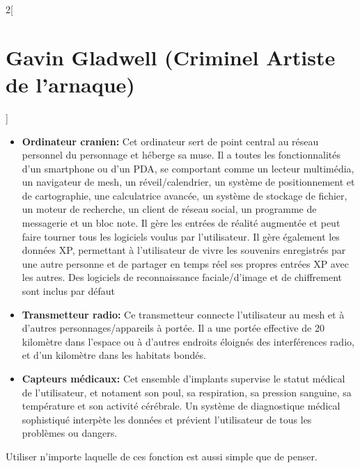 \documentclass[a4paper,9pt]{article}
\begin{document}
\begin{multicols}{2}[\section*{Gavin Gladwell (Criminel Artiste de l'arnaque)}]
\begin{itemize}
   \item \textbf{Ordinateur cranien:} Cet ordinateur sert de point central au
      réseau personnel du personnage et héberge sa muse. Il a toutes
      les fonctionnalités d'un smartphone ou d'un PDA, se comportant comme un
      lecteur multimédia, un navigateur de mesh, un réveil/calendrier, un
      système de positionnement et de cartographie, une calculatrice avancée,
      un système de stockage de fichier, un moteur de recherche, un client de
      réseau social, un programme de messagerie et un bloc note. Il gère les
      entrées de réalité augmentée et peut faire tourner tous les logiciels
      voulus par l'utilisateur. Il gère également les données XP, permettant à
      l'utilisateur de vivre les souvenirs enregistrés par une autre personne et
      de partager en temps réel ses propres entrées XP avec les autres. Des
      logiciels de reconnaissance faciale/d'image et de chiffrement
      sont inclus par défaut
   \item \textbf{Transmetteur radio:} Ce transmetteur connecte l'utilisateur au
      mesh et à d'autres personnages/appareils à portée. Il a une portée
      effective de 20 kilomètre dans l'espace ou à d'autres endroits éloignés
      des interférences radio, et d'un kilomètre dans les habitats bondés.
   \item \textbf{Capteurs médicaux:} Cet ensemble d'implants supervise le
      statut médical de l'utilisateur, et notament son poul, sa respiration, sa
      pression sanguine, sa température et son activité cérébrale. Un système de
      diagnostique médical sophistiqué interpète les données et prévient
      l'utilisateur de tous les problèmes ou dangers.
\end{itemize} 

Utiliser n'importe laquelle de ces fonction est aussi simple que de penser.


\end{multicols}
\end{document}
